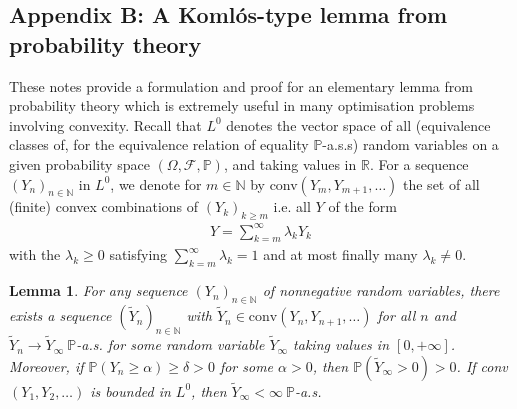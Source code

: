 \documentclass[12pt,a4paper, twoside]{article}
\newtheorem{lem}{Lemma}[section]
\theoremstyle{definition}
\newcommand{\PP}{\mathbb{P}} %
\begin{document}
\subsection{Appendix B: A Komlós-type lemma from probability theory}
These notes provide a formulation and proof for an elementary lemma from probability theory which is extremely useful in many optimisation problems involving convexity. Recall that $L^0$ denotes the vector space of all (equivalence classes of, for the equivalence relation of equality $\PP$-a.s.s) random variables on a given probability space $( \Omega, \mathcal{F},  \PP)$, and taking values in $\mathbb{R}$. For a sequence $(Y_n)_{n \in \mathbb{N}}$ in $L^0$, we denote for $m \in \mathbb{N}$ by conv$(Y_m, Y_{m+1}, \dots)$ the set of all (finite) convex combinations of $(Y_k)_{k \geq m}$ i.e. all $Y$ of the form 
\begin{align*}
Y = \sum_{k=m}^\infty \lambda_k Y_k
\end{align*}
with the $\lambda_k \geq 0$ satisfying $\sum_{k=m}^\infty \lambda_k =1$ and at most finally many $\lambda_k \neq 0$. 
\begin{lem} For any sequence $(Y_n)_{n \in \mathbb{N}}$ of nonnegative random variables, there exists a sequence $( \widetilde{Y}_n)_{n \in \mathbb{N}}$ with $\widetilde{Y}_n \in \text{conv}(Y_n, Y_{n+1}, \dots)$ for all $n$ and $\widetilde{Y}_n \to \widetilde{Y}_\infty \ \PP$-a.s. for some random variable $\widetilde{Y}_\infty$ taking values in $[0, + \infty]$. Moreover, if $\PP(Y_n \geq \alpha) \geq \delta >0$ for some $\alpha >0$, then $\PP(\widetilde{Y}_\infty >0)>0$. If conv$(Y_1, Y_2, \dots)$ is bounded in $L^0$, then $\widetilde{Y}_\infty < \infty \ \PP$-a.s.
\end{lem}
\end{document}
